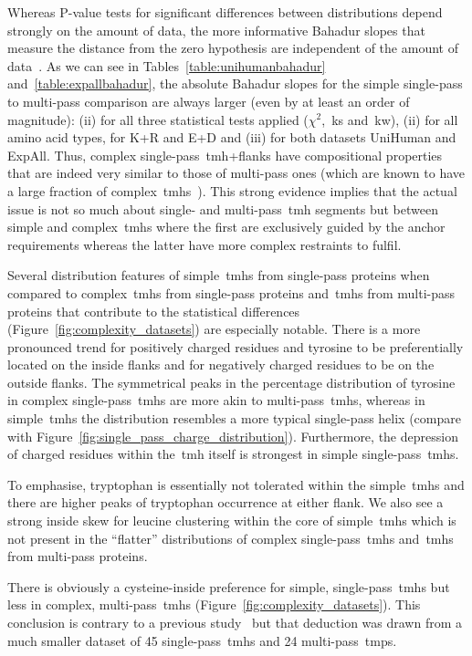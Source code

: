 Whereas P\--value tests for significant differences between distributions depend strongly on the amount of data, the more informative Bahadur slopes that measure the distance from the zero hypothesis are independent of the amount of data~\cite{Bahadur1967, Bahadur1971, Sunyaev1998}.
As we can see in Tables~\ref{table:unihumanbahadur} and~\ref{table:expallbahadur}, the absolute Bahadur slopes for the simple single-pass to multi-pass comparison are always larger (even by at least an order of magnitude): (ii) for all three statistical tests applied (\({\chi}^{2}\),~\gls{ks} and~\gls{kw}), (ii) for all amino acid types, for K+R and E+D and (iii) for both datasets UniHuman and ExpAll.
Thus, complex single-pass~\gls{tmh}+flanks have compositional properties that are indeed very similar to those of multi-pass ones (which are known to have a large fraction of complex~\gls{tmh}s~\cite{Wong2011, Wong2012}).
This strong evidence implies that the actual issue is not so much about single- and multi-pass~\gls{tmh} segments but between simple and complex~\gls{tmh}s where the first are exclusively guided by the anchor requirements whereas the latter have more complex restraints to fulfil.

Several distribution features of simple~\gls{tmh}s from single-pass proteins when compared to complex~\gls{tmh}s from single-pass proteins and~\gls{tmh}s from multi-pass proteins that contribute to the statistical differences (Figure~\ref{fig:complexity_datasets}) are especially notable.
There is a more pronounced trend for positively charged residues and tyrosine to be preferentially located on the inside flanks and for negatively charged residues to be on the outside flanks.
The symmetrical peaks in the percentage distribution of tyrosine in complex single-pass~\gls{tmh}s are more akin to multi-pass~\gls{tmh}s, whereas in simple~\gls{tmh}s the distribution resembles a more typical single-pass helix (compare with Figure~\ref{fig:single_pass_charge_distribution}).
Furthermore, the depression of charged residues within the~\gls{tmh} itself is strongest in simple single-pass~\gls{tmh}s.

To emphasise, tryptophan is essentially not tolerated within the simple~\gls{tmh}s and there are higher peaks of tryptophan occurrence at either flank.
We also see a strong inside skew for leucine clustering within the core of simple~\gls{tmh}s which is not present in the ``flatter'' distributions of complex single-pass~\gls{tmh}s and~\gls{tmh}s from multi-pass proteins.

There is obviously a cysteine-inside preference for simple, single-pass~\gls{tmh}s but less in complex, multi-pass~\gls{tmh}s (Figure~\ref{fig:complexity_datasets}).
This conclusion is contrary to a previous study~\cite{Nakashima1992} but that deduction was drawn from a much smaller dataset of 45 single-pass~\gls{tmh}s and 24 multi-pass~\gls{tmp}s.

